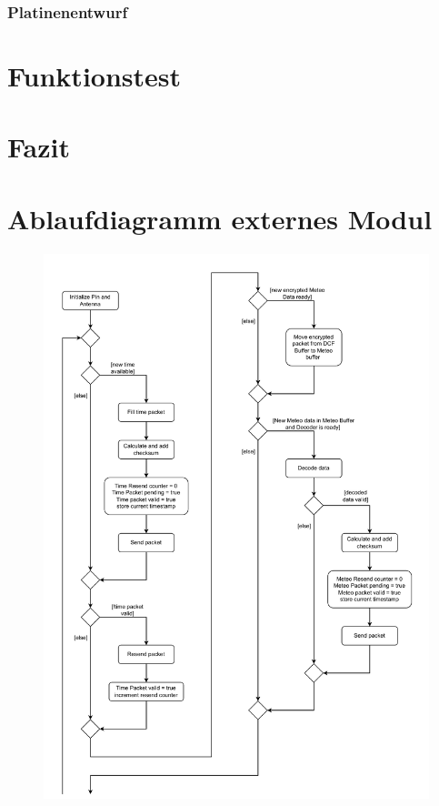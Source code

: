 \documentclass[a4paper,11pt]{article}
\begin{document}
\subsubsection{Platinenentwurf}
\label{subsubsub:platineIntern}


\section{Funktionstest}
\label{sub:funktionstest}

\section{Fazit}
\label{sub:fazit}

\newpage
\appendix

\section{Ablaufdiagramm externes Modul}
\label{subapp:ablaufExt}

\begin{figure}[H]
  \centering
  \includegraphics[scale=0.75, page=1]{Ablauf extern.pdf}
\end{figure}
\end{document}
